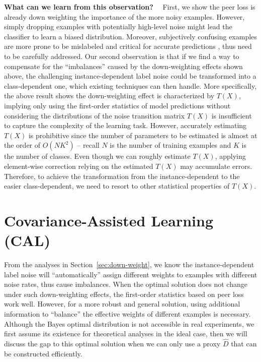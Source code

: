 \documentclass[final]{cvpr}
\newcommand{\estD}{{\hat D}}
\newcommand{\rev}[1]{{\color{blue}#1}}
\newcommand{\rev}[1]{#1}
\begin{document}
\noindent\textbf{What can we learn from this observation?}~~
First, we show the peer loss is already down weighting the importance of the more noisy examples. However, simply dropping examples with potentially high-level noise might lead the classifier to learn a biased distribution. \rev{Moreover, subjectively confusing examples are more prone to be mislabeled and critical for accurate predictions \cite{wang2021tackling}, thus need to be carefully addressed.} Our second observation is that if we find a way to compensate for the ``imbalances'' caused by the down-weighting effects shown above, the challenging instance-dependent label noise could be transformed into a class-dependent one, which existing techniques can then handle. More specifically, the above result shows the down-weighting effect is characterized by $T(X)$, implying only using the first-order statistics of model predictions without considering the distributions of the noise transition matrix $T(X)$ is insufficient to capture the complexity of the learning task. 
However, accurately estimating $T(X)$ is prohibitive since the number of parameters to be estimated is almost at the order of $O(NK^2)$ -- recall $N$ is the number of training examples and $K$ is the number of classes.
Even though we can roughly estimate $T(X)$, applying element-wise correction relying on the estimated $T(X)$ may accumulate errors.
Therefore, to achieve the transformation from the instance-dependent to the easier class-dependent, we need to resort to other statistical properties of $T(X)$.


 \section{Covariance-Assisted Learning (CAL)}\label{sec:theory}


From the analyses in Section~\ref{sec:down-weight}, we know the instance-dependent label noise will ``automatically'' assign different weights to examples with different noise rates, thus cause imbalances.
When the optimal solution does not change under such down-weighting effects, the first-order statistics based on peer loss \cite{sieve2020,liu2019peer} work well. 
However, for a more robust and general solution, using additional information to ``balance'' the effective weights of different examples is necessary.
Although the Bayes optimal distribution is not accessible in real experiments, we first assume its existence for theoretical analyses in the ideal case, then we will discuss the gap to this optimal solution when we can only use a proxy $\estD$ that can be constructed efficiently. 
\end{document}
